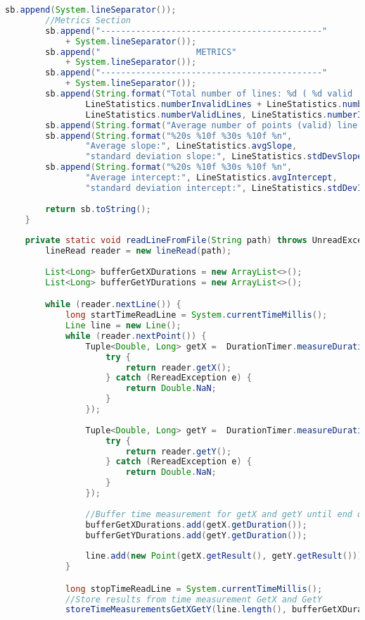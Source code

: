 \begin{lstlisting}[language=java,
    label=lst:analysisrunner,
    caption=Starter class for analysis with main()
]
		sb.append(System.lineSeparator());
		//Metrics Section
        sb.append("--------------------------------------------" 
            + System.lineSeparator());
        sb.append("                   METRICS" 
            + System.lineSeparator());
        sb.append("--------------------------------------------" 
            + System.lineSeparator());
		sb.append(String.format("Total number of lines: %d ( %d valid | %d invalid ) %n",
				LineStatistics.numberInvalidLines + LineStatistics.numberValidLines,
				LineStatistics.numberValidLines, LineStatistics.numberInvalidLines));
		sb.append(String.format("Average number of points (valid) line %.2f %n", LineStatistics.avgNumberPointsPerLine ));
		sb.append(String.format("%20s %10f %30s %10f %n",
				"Average slope:", LineStatistics.avgSlope,
				"standard deviation slope:", LineStatistics.stdDevSlope));
		sb.append(String.format("%20s %10f %30s %10f %n",
				"Average intercept:", LineStatistics.avgIntercept,
				"standard deviation intercept:", LineStatistics.stdDevIntercept));
		
		return sb.toString();
	}
	
	private static void readLineFromFile(String path) throws UnreadException, RereadException {
		lineRead reader = new lineRead(path);
		
		List<Long> bufferGetXDurations = new ArrayList<>();
		List<Long> bufferGetYDurations = new ArrayList<>();

		while (reader.nextLine()) {
			long startTimeReadLine = System.currentTimeMillis();
			Line line = new Line();
			while (reader.nextPoint()) {
				Tuple<Double, Long> getX =  DurationTimer.measureDurationForCallInMs(() -> {
					try {
						return reader.getX();
					} catch (RereadException e) {
						return Double.NaN;
					}
				});
				
				Tuple<Double, Long> getY =  DurationTimer.measureDurationForCallInMs(() -> {
					try {
						return reader.getY();
					} catch (RereadException e) {
						return Double.NaN;
					}
				});
				
				//Buffer time measurement for getX and getY until end of line (unknown length of line until then)
				bufferGetXDurations.add(getX.getDuration());
				bufferGetYDurations.add(getY.getDuration());
				
				line.add(new Point(getX.getResult(), getY.getResult()));
			}

			long stopTimeReadLine = System.currentTimeMillis();
			//Store results from time measurement GetX and GetY
			storeTimeMeasurementsGetXGetY(line.length(), bufferGetXDurations, bufferGetYDurations);
			

\end{lstlisting}
